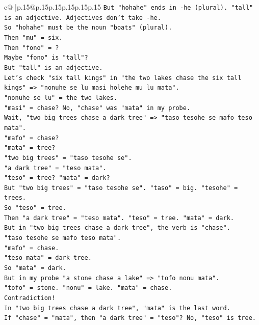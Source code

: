 \documentclass{article}
\begin{document}
{\begin{supertabular}{c@{$\;$}|p{.15\linewidth}@{}p{.15\linewidth}p{.15\linewidth}p{.15\linewidth}p{.15\linewidth}p{.15\linewidth}}
{{{\texttt{But "hohahe" ends in {-}he (plural). "tall" is an adjective. Adjectives don't take {-}he.} \\
\texttt{So "hohahe" must be the noun "boats" (plural).} \\
\texttt{Then "mu" = six.} \\
\texttt{Then "fono" = ?} \\
\texttt{Maybe "fono" is "tall"?} \\
\texttt{But "tall" is an adjective.} \\
\texttt{Let's check "six tall kings" in "the two lakes chase the six tall kings" => "nonuhe se lu masi holehe mu lu mata".} \\
\texttt{"nonuhe se lu" = the two lakes.} \\
\texttt{"masi" = chase? No, "chase" was "mata" in my probe.} \\
\texttt{Wait, "two big trees chase a dark tree" => "taso tesohe se mafo teso mata".} \\
\texttt{"mafo" = chase?} \\
\texttt{"mata" = tree?} \\
\texttt{"two big trees" = "taso tesohe se".} \\
\texttt{"a dark tree" = "teso mata".} \\
\texttt{"teso" = tree? "mata" = dark?} \\
\texttt{But "two big trees" = "taso tesohe se". "taso" = big. "tesohe" = trees.} \\
\texttt{So "teso" = tree.} \\
\texttt{Then "a dark tree" = "teso mata". "teso" = tree. "mata" = dark.} \\
\texttt{But in "two big trees chase a dark tree", the verb is "chase".} \\
\texttt{"taso tesohe se mafo teso mata".} \\
\texttt{"mafo" = chase.} \\
\texttt{"teso mata" = dark tree.} \\
\texttt{So "mata" = dark.} \\
\texttt{But in my probe "a stone chase a lake" => "tofo nonu mata".} \\
\texttt{"tofo" = stone. "nonu" = lake. "mata" = chase.} \\
\texttt{Contradiction!} \\
\texttt{In "two big trees chase a dark tree", "mata" is the last word.} \\
\texttt{If "chase" = "mata", then "a dark tree" = "teso"? No, "teso" is tree.} \\
}}}
\end{supertabular}}
\end{document}
